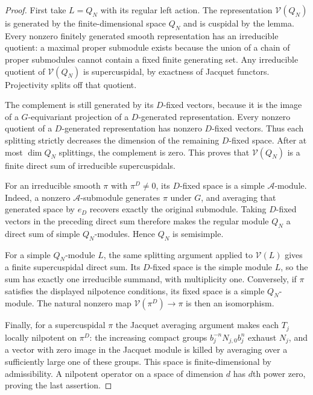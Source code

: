 \documentclass[10pt,letterpaper]{amsart}
\numberwithin{equation}{section}
\theoremstyle{remark}
\begin{document}
\begin{proof}
First take $L=Q_N$ with its regular left action. The representation
$\mathcal V(Q_N)$ is generated by the finite-dimensional space $Q_N$
and is cuspidal by the lemma. Every nonzero finitely generated smooth
representation has an irreducible quotient: a maximal proper submodule
exists because the union of a chain of proper submodules cannot contain
a fixed finite generating set. Any irreducible quotient of
$\mathcal V(Q_N)$ is supercuspidal, by exactness of Jacquet functors.
Projectivity splits off that quotient.

The complement is still generated by its $D$-fixed vectors, because it is
the image of a $G$-equivariant projection of a $D$-generated representation.
Every nonzero quotient of a $D$-generated representation has nonzero
$D$-fixed vectors. Thus each splitting strictly decreases the dimension
of the remaining $D$-fixed space. After at most $\dim Q_N$ splittings,
the complement is zero. This proves that $\mathcal V(Q_N)$ is a finite
direct sum of irreducible supercuspidals.

For an irreducible smooth $\pi$ with $\pi^D\ne0$, its $D$-fixed space is
a simple $\mathcal A$-module. Indeed, a nonzero $\mathcal A$-submodule
generates $\pi$ under $G$, and averaging that generated space by $e_D$
recovers exactly the original submodule. Taking $D$-fixed vectors in the
preceding direct sum therefore makes the regular module $Q_N$ a direct
sum of simple $Q_N$-modules. Hence $Q_N$ is semisimple.

For a simple $Q_N$-module $L$, the same splitting argument applied to
$\mathcal V(L)$ gives a finite supercuspidal direct sum. Its $D$-fixed
space is the simple module $L$, so the sum has exactly one irreducible
summand, with multiplicity one. Conversely, if $\pi$ satisfies the
displayed nilpotence conditions, its fixed space is a simple $Q_N$-module.
The natural nonzero map $\mathcal V(\pi^D)\to\pi$ is then an isomorphism.

Finally, for a supercuspidal $\pi$ the Jacquet averaging argument makes
each $T_j$ locally nilpotent on $\pi^D$: the increasing compact groups
$b_j^{-n}N_{j,0}b_j^n$ exhaust $N_j$, and a vector with zero image in
the Jacquet module is killed by averaging over a sufficiently large one
of these groups. This space is finite-dimensional
by admissibility. A nilpotent operator on a space of dimension $d$ has
$d$th power zero, proving the last assertion.
\end{proof}
\end{document}
